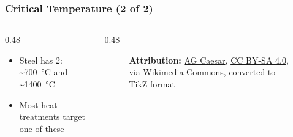 \begin{frame}
	\frametitle{Critical Temperature (2 of 2)}

    \begin{columns}
        \begin{column}{0.48\linewidth}
            \begin{itemize}[<+- | alert@+>]
                \item Steel has 2: \textasciitilde{}\qty{700}{\degreeCelsius} and \textasciitilde{}\qty{1400}{\degreeCelsius}
                \item Most heat treatments target one of these
            \end{itemize}
        \end{column}
        \begin{column}{0.48\linewidth}
            \begin{figure}
                \centering
                \resizebox{\linewidth}{!}{
                    
                }

                \vspace{0.5em}
                {\tiny \textbf{Attribution:} \href{https://commons.wikimedia.org/wiki/File:Iron_carbon_phase_diagram.svg}{AG Caesar}, \href{http://creativecommons.org/licenses/by-sa/4.0/}{CC BY-SA 4.0}, via Wikimedia Commons, converted to TikZ format\par}
            \end{figure}
        \end{column}
    \end{columns}
\end{frame}


